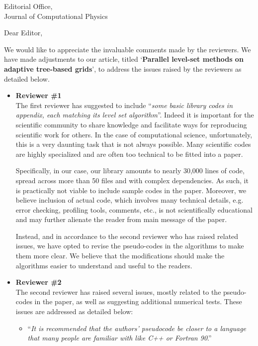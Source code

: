 \documentclass{scrlttr2}
\begin{document}
 
\begin{letter} {Editorial Office, \\ Journal of Computational
Physics} 

\opening{Dear Editor,} 
We would like to appreciate the invaluable comments made by the reviewers. We
have made adjustments to our article, titled `\textbf{Parallel level-set methods
on adaptive tree-based grids}', to address the issues raised by the reviewers as
detailed below. 

\begin{itemize} 
\item \textbf{Reviewer \#1} \\ 
The first reviewer has suggested to include ``\textit{some basic library codes
in appendix, each matching its level set algorithm}''. Indeed it is important
for the scientific community to share knowledge and facilitate ways for
reproducing scientific work for others. In the case of computational science,
unfortunately, this is a very daunting task that is not always possible.  Many
scientific codes are highly specialized and are often too technical to be fitted
into a paper. 

Specifically, in our case, our library amounts to nearly 30,000 lines of code,
spread across more than 50 files and with complex dependencies. As such, it is
practically not viable to include sample codes in the paper. Moreover, we
believe inclusion of actual code, which involves many technical details, e.g.
error checking, profiling tools, comments, etc., is not scientifically
educational and may further alienate the reader from main message of the paper.

Instead, and in accordance to the second reviewer who has raised related issues,
we have opted to revise the pseudo-codes in the algorithms to make them more
clear. We believe that the modifications should make the algorithms easier to
understand and useful to the readers.

\item \textbf{Reviewer \#2} \\ 
The second reviewer has raised several issues, mostly related to the
pseudo-codes in the paper, as well as suggesting additional numerical tests.
These issues are addressed as detailed below: 

\begin{itemize} 
\item ``\textit{It is recommended that the authors' pseudocode be closer to a
  language that many people are familiar with like C++ or Fortran 90}.''


\end{itemize}
\end{itemize}
\end{letter}
\end{document}
